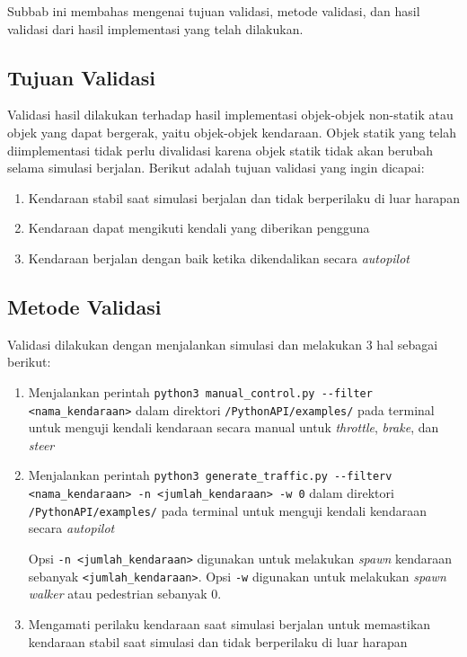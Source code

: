 Subbab ini membahas mengenai tujuan validasi, metode validasi, dan hasil
validasi dari hasil implementasi yang telah dilakukan.

\subsection{Tujuan Validasi}

Validasi hasil dilakukan terhadap hasil implementasi objek-objek non-statik atau
objek yang dapat bergerak, yaitu objek-objek kendaraan. Objek statik yang telah
diimplementasi tidak perlu divalidasi karena objek statik tidak akan berubah
selama simulasi berjalan. Berikut adalah tujuan validasi yang ingin dicapai:


\begin{enumerate}
    \item Kendaraan stabil saat simulasi berjalan dan tidak berperilaku di luar
    harapan
    \item Kendaraan dapat mengikuti kendali yang diberikan pengguna
    \item Kendaraan berjalan dengan baik ketika dikendalikan secara
    \textit{autopilot}
\end{enumerate}

\subsection{Metode Validasi}

Validasi dilakukan dengan menjalankan simulasi dan melakukan 3 hal sebagai
berikut:

\begin{enumerate}

    \item Menjalankan perintah \verb|python3 manual_control.py --filter|
    \verb|<nama_kendaraan>| dalam direktori \verb|/PythonAPI/examples/| pada
    terminal untuk menguji kendali kendaraan secara manual untuk
    \textit{throttle}, \textit{brake}, dan \textit{steer}

    \item Menjalankan perintah \verb|python3 generate_traffic.py --filterv|
    \verb|<nama_kendaraan> -n <jumlah_kendaraan> -w 0| dalam direktori \verb|/PythonAPI/examples/|
    pada terminal untuk menguji kendali kendaraan secara \textit{autopilot}

    Opsi \verb|-n <jumlah_kendaraan>| digunakan untuk melakukan \textit{spawn}
    kendaraan sebanyak \verb|<jumlah_kendaraan>|. Opsi \verb|-w| digunakan untuk
    melakukan \textit{spawn} \textit{walker} atau pedestrian sebanyak 0.

    \item Mengamati perilaku kendaraan saat simulasi berjalan untuk memastikan
    kendaraan stabil saat simulasi dan tidak berperilaku di luar harapan

\end{enumerate}

